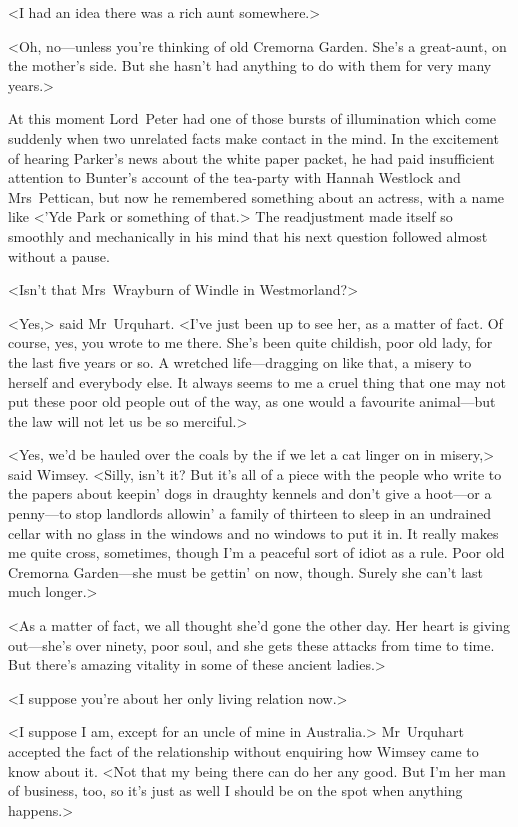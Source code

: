<I had an idea there was a rich aunt somewhere.>

<Oh, no—unless you're thinking of old Cremorna Garden. She's a great-aunt, on the mother's side. But she hasn't had anything to do with them for very many years.>

At this moment Lord~Peter had one of those bursts of illumination which come suddenly when two unrelated facts make contact in the mind. In the excitement of hearing Parker's news about the white paper packet, he had paid insufficient attention to Bunter's account of the tea-party with Hannah Westlock and Mrs~Pettican, but now he remembered something about an actress, with a name like <'Yde Park or something of that.> The readjustment made itself so smoothly and mechanically in his mind that his next question followed almost without a pause.

<Isn't that Mrs~Wrayburn of Windle in Westmorland?>

<Yes,> said Mr~Urquhart. <I've just been up to see her, as a matter of fact. Of course, yes, you wrote to me there. She's been quite childish, poor old lady, for the last five years or so. A wretched life—dragging on like that, a misery to herself and everybody else. It always seems to me a cruel thing that one may not put these poor old people out of the way, as one would a favourite animal—but the law will not let us be so merciful.>

<Yes, we'd be hauled over the coals by the  if we let a cat linger on in misery,> said Wimsey. <Silly, isn't it? But it's all of a piece with the people who write to the papers about keepin' dogs in draughty kennels and don't give a hoot—or a penny—to stop landlords allowin' a family of thirteen to sleep in an undrained cellar with no glass in the windows and no windows to put it in. It really makes me quite cross, sometimes, though I'm a peaceful sort of idiot as a rule. Poor old Cremorna Garden—she must be gettin' on now, though. Surely she can't last much longer.>

<As a matter of fact, we all thought she'd gone the other day. Her heart is giving out—she's over ninety, poor soul, and she gets these attacks from time to time. But there's amazing vitality in some of these ancient ladies.>

<I suppose you're about her only living relation now.>

<I suppose I am, except for an uncle of mine in Australia.> Mr~Urquhart accepted the fact of the relationship without enquiring how Wimsey came to know about it. <Not that my being there can do her any good. But I'm her man of business, too, so it's just as well I should be on the spot when anything happens.>

